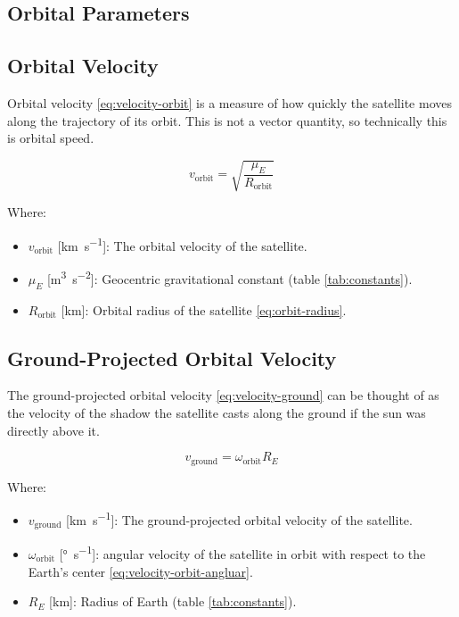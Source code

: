 \documentclass{article}
\begin{document}
\begin{itemize}[label={}]
\section{Orbital Parameters}

\subsection{Orbital Velocity}
Orbital velocity \eqref{eq:velocity-orbit} is a measure of how quickly the satellite moves along the trajectory of its orbit. This is not a vector quantity, so technically this is orbital speed.

\begin{equation} \label{eq:velocity-orbit}
    v_{\text{orbit}} = \sqrt{\frac{\mu_E}{R_{\text{orbit}}}}
\end{equation}

Where:
\begin{itemize}[label={}]
    \item $v_{\text{orbit}}$ [\si{\km\per\s}]: The orbital velocity of the satellite.
    \item $\mu_E$ [\si{\m\cubed\per\s\squared}]: Geocentric gravitational constant (table \ref{tab:constants}).
    \item $R_{\text{orbit}}$ [\si{\km}]: Orbital radius of the satellite \eqref{eq:orbit-radius}.
\end{itemize}

\subsection{Ground-Projected Orbital Velocity}
The ground-projected orbital velocity \eqref{eq:velocity-ground} can be thought of as the velocity of the shadow the satellite casts along the ground if the sun was directly above it.

\begin{equation} \label{eq:velocity-ground}
    v_{\text{ground}} = \omega_{\text{orbit}} R_E
\end{equation}

Where:
\begin{itemize}[label={}]
    \item $v_{\text{ground}}$ [\si{\km\per\s}]: The ground-projected orbital velocity of the satellite.
    \item $\omega_{\text{orbit}}$ [\si{\degree\per\s}]: angular velocity of the satellite in orbit with respect to the Earth's center \eqref{eq:velocity-orbit-angluar}.
    \item $R_E$ [\si{\km}]: Radius of Earth (table \ref{tab:constants}).
\end{itemize}


\end{itemize}
\end{document}
